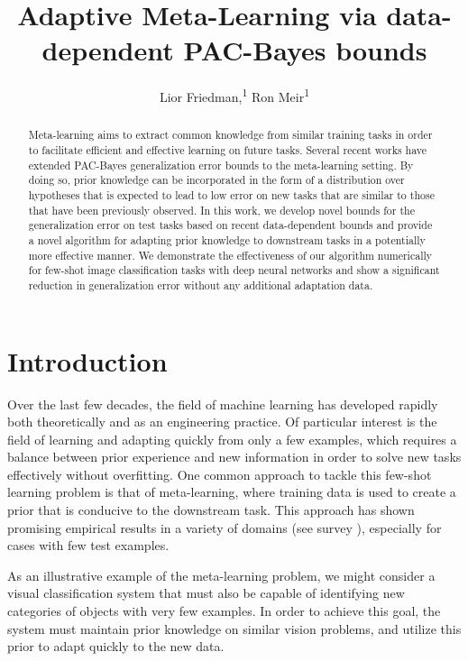 \documentclass{article} %
\title{Adaptive Meta-Learning via data-dependent PAC-Bayes bounds}
\author{
	Lior Friedman,\textsuperscript{\rm 1}
	Ron Meir\textsuperscript{\rm 1}
}
\theoremstyle{definition}
\begin{document}
	
\maketitle

\begin{abstract}
	Meta-learning aims to extract common knowledge from similar training tasks in order to facilitate efficient and effective learning on future tasks. Several recent works have extended PAC-Bayes generalization error bounds to the meta-learning setting.
	By doing so, prior knowledge can be incorporated in the form of a distribution over hypotheses that is expected to lead to low error on new tasks that are similar to those that have been previously observed.
	In this work, we develop novel bounds for the generalization error on test tasks based on recent data-dependent bounds and provide a novel algorithm for adapting prior knowledge to downstream tasks in a potentially more effective manner.
	We demonstrate the effectiveness of our algorithm numerically for few-shot image classification tasks with deep neural networks and show a significant reduction in generalization error without any additional adaptation data.
\end{abstract}

\section{Introduction}

Over the last few decades, the field of machine learning has developed rapidly both theoretically and as an engineering practice. Of particular interest is the field of learning and adapting quickly from only a few examples, which requires a balance between prior experience and new information in order to solve new tasks effectively without overfitting.
One common approach to tackle this few-shot learning problem is that of meta-learning, where training data is used to create a prior that is conducive to the downstream task. This approach has shown promising empirical results in a variety of domains (see survey \citep{Hospedales2021}), especially for cases with few test examples.

As an illustrative example of the meta-learning problem, we might consider a visual classification system that must also be capable of identifying new categories of objects with very few examples. In order to achieve this goal, the system must maintain prior knowledge on similar vision problems, and utilize this prior to adapt quickly to the new data.
\end{document}
